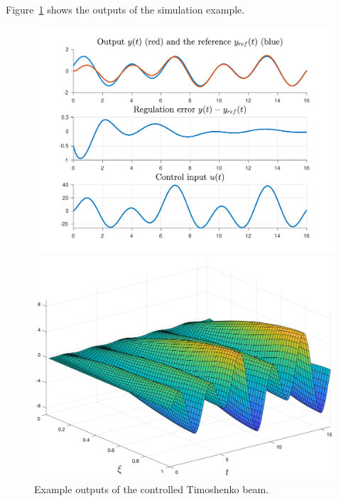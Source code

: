 \documentclass[11pt, a4paper]{amsart}
\theoremstyle{definition}
\numberwithin{equation}{section}
\begin{document}
Figure~\ref{fig:BeamTim1} shows the outputs of the simulation example.

\begin{figure}[h!]
  \begin{minipage}{0.48\linewidth}
    \begin{flushleft}
      \includegraphics[width=\linewidth]{BTim1outputs.pdf}
    \end{flushleft}
  \end{minipage}
  \begin{minipage}{0.48\linewidth}
    \begin{flushright}
      \includegraphics[width=0.95\linewidth]{BTim1profile.png}
    \end{flushright}
  \end{minipage}
    \caption{Example outputs of the controlled Timoshenko beam.}
  \label{fig:BeamTim1}
\end{figure}
\end{document}
